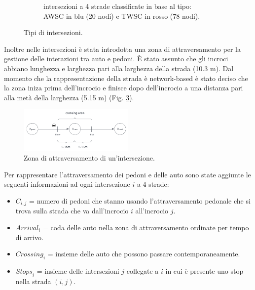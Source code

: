 \begin{figure}
\begin{subfigure}{0.475\textwidth}
        \caption{intersezioni a 4 strade classificate in base al tipo: AWSC in blu (20 nodi) e TWSC in rosso (78 nodi).}
        \label{fig:intersections_types}
    \end{subfigure}
    \caption{Tipi di intersezioni.}
\end{figure}

Inoltre nelle intersezioni è stata introdotta una zona di attraversamento per la gestione delle interazioni tra auto e pedoni.
È stato assunto che gli incroci abbiano lunghezza e larghezza pari alla larghezza della strada (10.3 m).
Dal momento che la rappresentazione della strada è network-based è stato deciso che
la zona iniza prima dell'incrocio e finisce dopo dell'incrocio a una distanza pari alla metà della larghezza (5.15 m) (Fig. \ref{fig:crossing-area}).

\begin{figure}[ht]
    \centering
    \includegraphics[width=0.5\textwidth]{images/crossing_area}
    \caption{Zona di attraversamento di un'intersezione.}
    \label{fig:crossing-area}
\end{figure}

\newpage
Per rappresentare l'attraversamento dei pedoni e delle auto sono state aggiunte le seguenti informazioni ad ogni intersezione $i$ a 4 strade:
\begin{itemize}
    \item $C_{i, j}$ = numero di pedoni che stanno usando l'attraversamento pedonale che si trova sulla strada che va dall'incrocio $i$ all'incrocio $j$.
    \item $\textit{Arrival}_i$ = coda delle auto nella zona di attraversamento ordinate per tempo di arrivo.
    \item $\textit{Crossing}_i$ = insieme delle auto che possono passare contemporaneamente.
    \item $\textit{Stops}_i$ = insieme delle intersezioni $j$ collegate a $i$ in cui è presente uno stop nella strada $(i, j)$.
\end{itemize}


